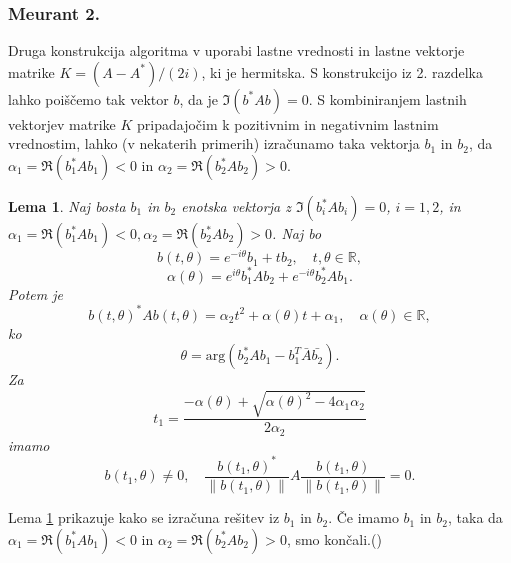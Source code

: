 \documentclass[12pt,a4paper]{amsart}
\theoremstyle{definition}
\theoremstyle{plain}
\newtheorem{lema}[definicija]{Lema}
\newcommand{\R}{\mathbb R}
\newcommand{\norm}[1]{\left\lVert#1\right\rVert}
\begin{document}
\subsubsection{Meurant 2.}\label{Meurant 2}
Druga konstrukcija algoritma v \cite{meurant} uporabi lastne vrednosti in lastne vektorje matrike $K=(A-A^\ast)/(2i)$, ki je hermitska. 
S konstrukcijo iz 2. razdelka lahko poiščemo tak vektor $b$, da je $\Im(b^\ast Ab)=0$. 
S kombiniranjem lastnih vektorjev matrike $K$ pripadajočim k pozitivnim in negativnim lastnim vrednostim, lahko (v nekaterih primerih) izračunamo taka vektorja $b_1$ in $b_2$, da $\alpha_1=\Re(b_1^\ast Ab_1)<0$ in $\alpha_2=\Re(b_2^\ast Ab_2)>0$. 
\begin{lema}\label{komp}
Naj bosta $b_1$ in $b_2$ enotska vektorja z $\Im(b_i^\ast Ab_i)=0$, $i=1,2$, in $\alpha_1=\Re(b_1^\ast Ab_1)<0, \alpha_2=\Re(b_2^\ast Ab_2)>0$. Naj bo 
$$b(t,\theta)=e^{-i\theta}b_1 + tb_2, \quad t,\theta \in \R,$$ 
$$\alpha(\theta)=e^{i\theta}b_1^\ast Ab_2 +e^{-i\theta}b_2^\ast Ab_1.$$
Potem je 
$$b(t,\theta)^\ast Ab(t,\theta)=\alpha_2 t^2 +\alpha(\theta)t+\alpha_1,\quad \alpha(\theta)\in\R,$$ ko 
$$\theta=\text{arg}(b_2^\ast Ab_1 -b_1^T\bar{A}\bar{b_2}).$$ Za 
$$t_1 = \frac{-\alpha(\theta) + \sqrt{\alpha(\theta)^2 - 4\alpha_1 \alpha_2}}{2\alpha_2}$$ imamo 
$$b(t_1, \theta) \not=0,\quad  \frac{b(t_1,\theta)^\ast}{\norm{b(t_1,\theta)}}A\frac{b(t_1,\theta)}{\norm{b(t_1,\theta)}}=0.$$
\end{lema}
Lema \ref{komp} prikazuje kako se izračuna rešitev iz $b_1$ in $b_2$. Če imamo $b_1$ in $b_2$, taka da  $\alpha_1=\Re(b_1^\ast Ab_1)<0$ in $\alpha_2=\Re(b_2^\ast Ab_2)>0$, smo končali.(\cite{meurant})
\end{document}
